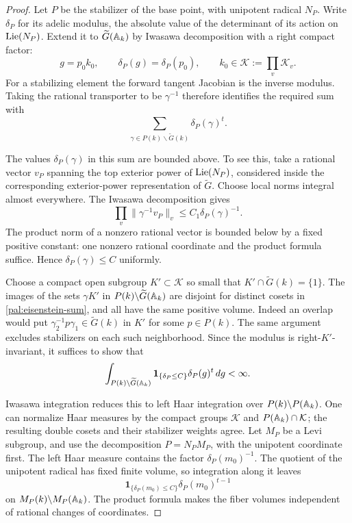 \begin{proof}
Let $P$ be the stabilizer of the base point, with unipotent radical $N_P$.
Write $\delta_P$ for its adelic modulus, the absolute value of the
determinant of its action on $\operatorname{Lie}(N_P)$.  Extend it to
$\widetilde G(\mathbb A_k)$ by Iwasawa decomposition with a right compact
factor:
\[
 g=p_0k_0,\qquad \delta_P(g)=\delta_P(p_0),\qquad
 k_0\in\mathcal K:=\prod_v\mathcal K_v.
\]
For a stabilizing element the forward tangent Jacobian is the inverse
modulus.  Taking the rational transporter to be $\gamma^{-1}$ therefore
identifies the required sum with
\begin{equation}\label{pal:eisenstein-sum}
 \sum_{\gamma\in P(k)\backslash\widetilde G(k)}\delta_P(\gamma)^t.
\end{equation}

The values $\delta_P(\gamma)$ in this sum are bounded above.  To see this,
take a rational vector $v_P$ spanning the top exterior power of
$\operatorname{Lie}(N_P)$, considered inside the corresponding exterior-power
representation of $\widetilde G$.  Choose local norms integral almost
everywhere.  The Iwasawa decomposition gives
\[
 \prod_v\|\gamma^{-1}v_P\|_v\leq C_1\delta_P(\gamma)^{-1}.
\]
The product norm of a nonzero rational vector is bounded below by a
fixed positive constant: one nonzero rational coordinate and the product
formula suffice.  Hence $\delta_P(\gamma)\leq C$ uniformly.

Choose a compact open subgroup $K'\subset\mathcal K$ so small that
$K'\cap\widetilde G(k)=\{1\}$.  The images of the sets $\gamma K'$ in
$P(k)\backslash\widetilde G(\mathbb A_k)$ are disjoint for distinct cosets in
\eqref{pal:eisenstein-sum}, and all have the same positive volume.
Indeed an overlap would put $\gamma_2^{-1}p\gamma_1\in\widetilde G(k)$
in $K'$ for some $p\in P(k)$.  The same argument excludes stabilizers
on each such neighborhood.  Since the modulus is right-$K'$-invariant,
it suffices to show that
\[
 \int_{P(k)\backslash\widetilde G(\mathbb A_k)}
 \mathbf1_{\{\delta_P\leq C\}}\delta_P(g)^t\,dg<\infty.
\]

Iwasawa integration reduces this to left Haar integration over
$P(k)\backslash P(\mathbb A_k)$.  One can normalize Haar measures by the
compact groups $\mathcal K$ and $P(\mathbb A_k)\cap\mathcal K$; the resulting
double cosets and their stabilizer weights agree.  Let $M_P$ be a Levi
subgroup, and use the decomposition $P=N_P M_P$, with the unipotent
coordinate first.  The left Haar measure contains the factor
$\delta_P(m_0)^{-1}$.  The quotient of the unipotent radical has fixed
finite volume, so integration along it leaves
\[
 \mathbf1_{\{\delta_P(m_0)\leq C\}}
 \delta_P(m_0)^{t-1}
\]
on $M_P(k)\backslash M_P(\mathbb A_k)$.  The product formula makes the
fiber volumes independent of rational changes of coordinates.


\end{proof}
